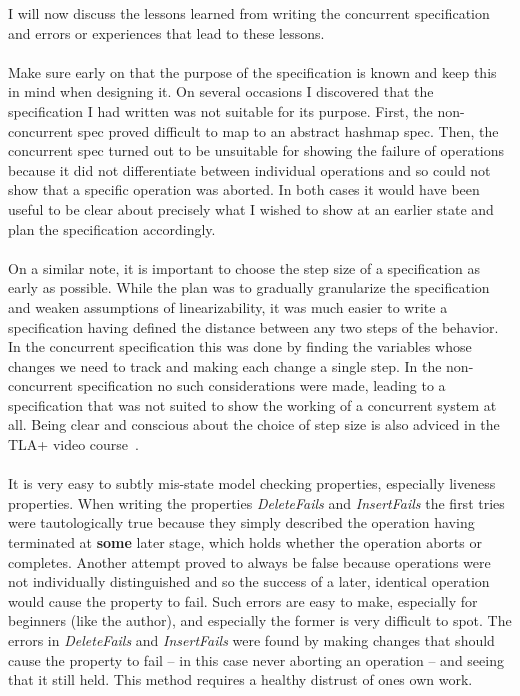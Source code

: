 \documentclass{uit-thesis}
\begin{document}
I will now discuss the lessons learned from writing the concurrent specification and errors or experiences that lead to these lessons.
\\\\
Make sure early on that the purpose of the specification is known and keep this in mind when designing it. On several occasions I discovered that the specification I had written was not suitable for its purpose. First, the non-concurrent spec proved difficult to map to an abstract hashmap spec. Then, the concurrent spec turned out to be unsuitable for showing the failure of operations because it did not differentiate between individual operations and so could not show that a specific operation was aborted. In both cases it would have been useful to be clear about precisely what I wished to show at an earlier state and plan the specification accordingly.
\\\\
On a similar note, it is important to choose the step size of a specification as early as possible. While the plan was to gradually granularize the specification and weaken assumptions of linearizability, it was much easier to write a specification having defined the distance between any two steps of the behavior. In the concurrent specification this was done by finding the variables whose changes we need to track and making each change a single step. In the non-concurrent specification no such considerations were made, leading to a specification that was not suited to show the working of a concurrent system at all. Being clear and conscious about the choice of step size is also adviced in the TLA+ video course~\cite{Lamport_video_2019}.
\\\\
It is very easy to subtly mis-state model checking properties, especially liveness properties. When writing the properties \textit{DeleteFails} and \textit{InsertFails} the first tries were tautologically true because they simply described the operation having terminated at \textbf{some} later stage, which holds whether the operation aborts or completes. Another attempt proved to always be false because operations were not individually distinguished and so the success of a later, identical operation would cause the property to fail. Such errors are easy to make, especially for beginners (like the author), and especially the former is very difficult to spot. The errors in \textit{DeleteFails} and \textit{InsertFails} were found by making changes that should cause the property to fail -- in this case never aborting an operation -- and seeing that it still held. This method requires a healthy distrust of ones own work.
\end{document}
